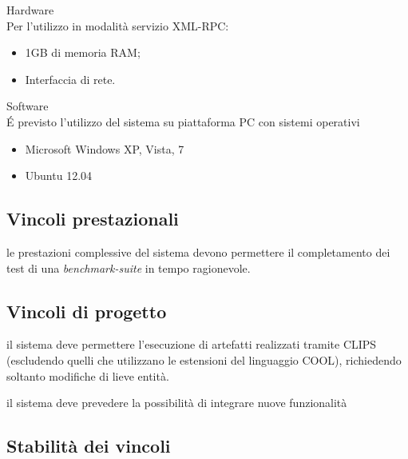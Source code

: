 \vincolistart
	\item Hardware\\
	Per l'utilizzo in modalità servizio XML-RPC:
	\begin{itemize}
		\item 1GB di memoria RAM;
		\item Interfaccia di rete.
	\end{itemize}
	\item Software\\
	\'E previsto l'utilizzo del sistema su piattaforma PC con sistemi operativi
	\begin{itemize}
		\item Microsoft Windows XP, Vista, 7
		\item Ubuntu 12.04
	\end{itemize}
\vincoliend

\subsection{Vincoli prestazionali}
\vincolistart
	\item le prestazioni complessive del sistema devono permettere il completamento dei test di una \emph{benchmark-suite} in tempo ragionevole.
\vincoliend
\subsection{Vincoli di progetto}
\vincolistart
	\item il sistema deve permettere l'esecuzione di artefatti realizzati tramite CLIPS (escludendo quelli che utilizzano le estensioni del linguaggio COOL), richiedendo soltanto modifiche di lieve entità.
	
	\item il sistema deve prevedere la possibilità di integrare nuove funzionalità
\vincoliend

\subsection{Stabilità dei vincoli}

